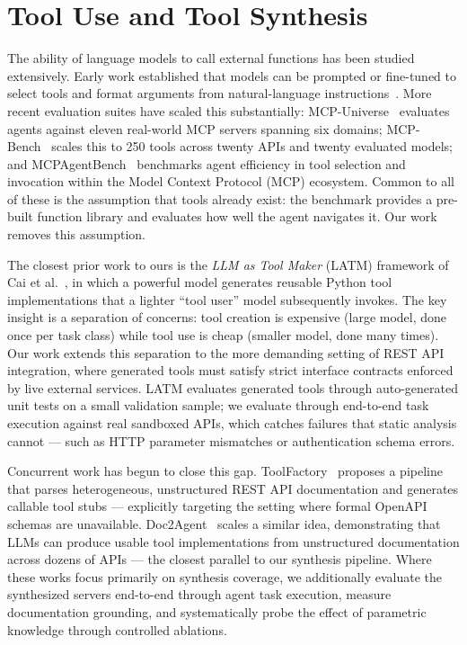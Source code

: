 \documentclass[12pt]{report}
\begin{document}
\section{Tool Use and Tool Synthesis}

The ability of language models to call external functions has been studied
extensively. Early work established that models can be prompted or fine-tuned
to select tools and format arguments from natural-language
instructions~\cite{schick2023toolformer,qin2023toolbench}. More recent
evaluation suites have scaled this substantially: MCP-Universe~\cite{mcpuniverse2025}
evaluates agents against eleven real-world MCP servers spanning six domains;
MCP-Bench~\cite{mcpbench2025} scales this to 250 tools across twenty APIs
and twenty evaluated models; and MCPAgentBench~\cite{mcpagentbench2024}
benchmarks agent efficiency in tool selection and invocation within the
Model Context Protocol (MCP) ecosystem. Common to all of these
is the assumption that tools already exist: the benchmark provides a pre-built
function library and evaluates how well the agent navigates it. Our work
removes this assumption.

The closest prior work to ours is the \emph{LLM as Tool Maker} (LATM)
framework of Cai et al.~\cite{cai2023latm}, in which a powerful model
generates reusable Python tool implementations that a lighter ``tool user''
model subsequently invokes. The key insight is a separation of concerns:
tool creation is expensive (large model, done once per task class) while
tool use is cheap (smaller model, done many times). Our work extends this
separation to the more demanding setting of REST API integration, where
generated tools must satisfy strict interface contracts enforced by live
external services. LATM evaluates generated tools through auto-generated unit tests on a small
validation sample; we evaluate through end-to-end task execution against
real sandboxed APIs, which catches failures that static analysis cannot ---
such as HTTP parameter mismatches or authentication schema errors.

Concurrent work has begun to close this gap. ToolFactory~\cite{toolfactory2025}
proposes a pipeline that parses heterogeneous, unstructured REST API
documentation and generates callable tool stubs --- explicitly targeting the
setting where formal OpenAPI schemas are unavailable. Doc2Agent~\cite{doc2agent2025}
scales a similar idea, demonstrating that LLMs can produce usable tool
implementations from unstructured documentation across dozens of APIs ---
the closest parallel to our synthesis pipeline. Where these works
focus primarily on synthesis coverage, we additionally evaluate the synthesized
servers end-to-end through agent task execution, measure documentation
grounding, and systematically probe the effect of parametric knowledge
through controlled ablations.
\end{document}
